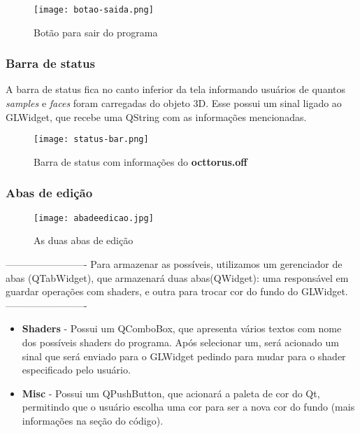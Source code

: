 \begin{figure}[H]
    \centering
    \texttt{[image: botao-saida.png]}
    \caption{Botão para sair do programa}
\end{figure}

\subsubsection{Barra de status}

A barra de status fica no canto inferior da tela 
informando usuários de quantos \emph{samples} e \emph{faces} foram carregadas 
do objeto 3D.
Esse possui um sinal ligado ao GLWidget, que recebe 
uma QString com as informações mencionadas.

\begin{figure}[H]
    \centering
    \texttt{[image: status-bar.png]}
    \caption{Barra de status com informações do \textbf{octtorus.off}}
\end{figure}

\newpage

\subsubsection{Abas de edição}

\begin{figure}[H]
    \centering
    \texttt{[image: abadeedicao.jpg]}
    \caption{As duas abas de edição}
\end{figure}

-------------------------
Para armazenar as possíveis, utilizamos um gerenciador 
de abas (QTabWidget), que armazenará duas abas(QWidget): uma 
responsável em guardar operações com shaders, e outra 
para trocar cor do fundo do GLWidget.
-------------------------

\begin{itemize}
    \item \textbf{Shaders} - Possui um QComboBox, que apresenta 
    vários textos com nome dos possíveis shaders do 
    programa. Após selecionar um, será acionado um sinal 
    que será enviado para o GLWidget pedindo para mudar 
    para o shader especificado pelo usuário.
    \item \textbf{Misc} - Possui um QPushButton, que acionará a 
    paleta de cor do Qt, permitindo que o usuário escolha 
    uma cor para ser a nova cor do fundo (mais informações 
    na seção do código).
\end{itemize}